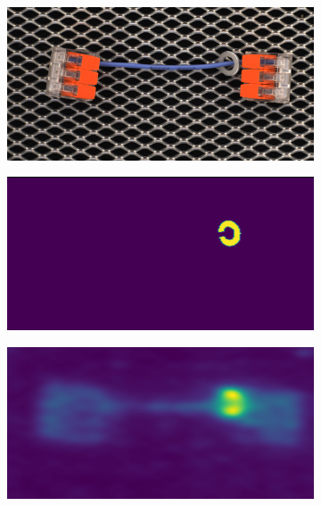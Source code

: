 \begin{figure}[htbp]
    \centering
    \begin{subfigure}[b]{0.3\textwidth}
        \includegraphics[width=\textwidth]{figures/test/051.png}

    \end{subfigure}
    \hfill
    \begin{subfigure}[b]{0.3\textwidth}
        \includegraphics[width=\textwidth]{figures/test/051_mask.png}

    \end{subfigure}
    \hfill
    \begin{subfigure}[b]{0.3\textwidth}
        \includegraphics[width=\textwidth]{figures/test/051_segment.png}

    \end{subfigure}

    \label{fig:calaction}
\end{figure}
